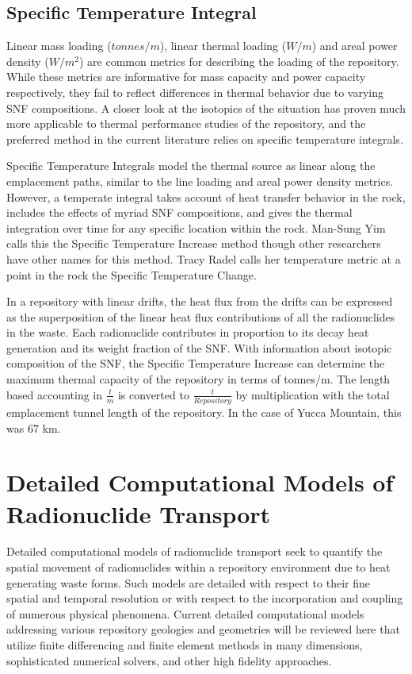 \subsection{Specific Temperature Integral}

Linear mass loading ($tonnes/m$), linear thermal loading ($W/m$) and areal power 
density ($W/m^2$) are common metrics
for describing the loading of the repository. While these metrics are
informative for mass capacity and power capacity respectively, they fail to
reflect differences in thermal behavior due to varying SNF compositions.  A
closer look at the isotopics of the situation has proven much more applicable
to thermal performance studies of the repository, and the preferred method in
the current literature relies on specific temperature integrals.


Specific Temperature Integrals model the thermal source as linear along the
emplacement paths, similar to the line loading and areal power density metrics.
However, a temperate integral takes account of heat transfer behavior in the
rock, includes the effects of myriad SNF compositions, and gives the thermal
integration over time for any specific location within the rock.  Man-Sung Yim
calls this the Specific Temperature Increase method\cite{li_specific_2008}
though other researchers have other names for this method. Tracy Radel calls
her temperature metric at a point in the rock the Specific Temperature
Change\cite{radel_repository_2007}.

In a repository with linear drifts, the heat flux from the drifts can be
expressed as the superposition of the linear heat flux contributions of all the
radionuclides in the waste. Each radionuclide contributes in proportion to its
decay heat generation and its weight fraction of the SNF. With information
about isotopic composition of the SNF, the Specific Temperature Increase can
determine the maximum thermal capacity of the repository in terms of tonnes/m.
The length based accounting in $\frac{t}{m}$ is converted to
$\frac{t}{Repository}$ by multiplication with the total emplacement tunnel
length of the repository.  In the case of Yucca Mountain, this was 67 km.

\section{Detailed Computational Models of Radionuclide Transport}
\label{sec:detailed_radionuclide}

Detailed computational models of radionuclide transport seek to quantify the spatial 
movement of radionuclides within a repository environment due to heat 
generating waste forms. Such models are detailed with respect to their fine 
spatial and temporal resolution or with respect to the incorporation and 
coupling of numerous physical phenomena. Current detailed computational models 
addressing various repository geologies and geometries will be reviewed here 
that utilize finite differencing and finite element methods in many dimensions, 
sophisticated numerical solvers, and other high fidelity approaches.

